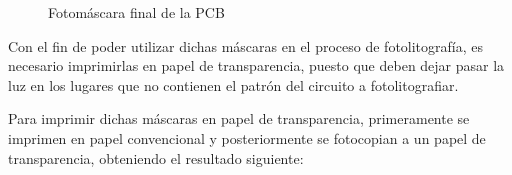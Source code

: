 \begin{itemize}
     \begin{figure}[htbp]
    \centering
    \caption{Fotomáscara final de la PCB} \label{fig:lego}
    \end{figure}
    
   Con el fin de poder utilizar dichas máscaras en el proceso de fotolitografía, es necesario imprimirlas en papel de transparencia, puesto que deben dejar pasar la luz en los lugares que no contienen el patrón del circuito a fotolitografiar.
   
   Para imprimir dichas máscaras en papel de transparencia, primeramente se imprimen en papel convencional y posteriormente se fotocopian a un papel de transparencia, obteniendo el resultado siguiente:
   

\end{itemize}
